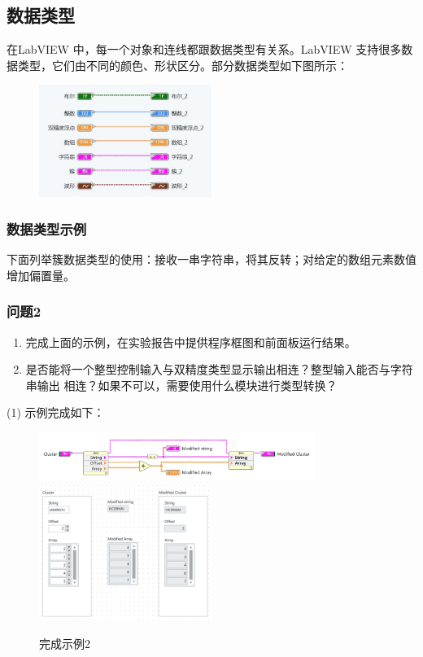 \documentclass{../source/Experiment}
\begin{document}
        \subsection{数据类型}
        在LabVIEW 中，每一个对象和连线都跟数据类型有关系。LabVIEW 支持很多数据类型，它们由不同的颜色、形状区分。部分数据类型如下图所示：
        \begin{figure}
            \centering
            \includegraphics[width = 0.5\textwidth]{lab8/fig1.jpg}
        \end{figure}
        \subsubsection{数据类型示例}
        下面列举簇数据类型的使用：接收一串字符串，将其反转；对给定的数组元素数值增加偏置量。
        \subsubsection{问题2}
        \begin{enumerate}
            \item 完成上面的示例，在实验报告中提供程序框图和前面板运行结果。
            \item 是否能将一个整型控制输入与双精度类型显示输出相连？整型输入能否与字符串输出
            相连？如果不可以，需要使用什么模块进行类型转换？
        \end{enumerate}
        (1)  示例完成如下：

        \begin{figure}[H]
            \centering
            \includegraphics[width = 0.8\textwidth]{lab8/lab1-3-a.jpg}
            \includegraphics[width = 0.5\textwidth]{lab8/lab1-3-b.jpg}
            \caption{完成示例2}
        \end{figure}
\end{document}
